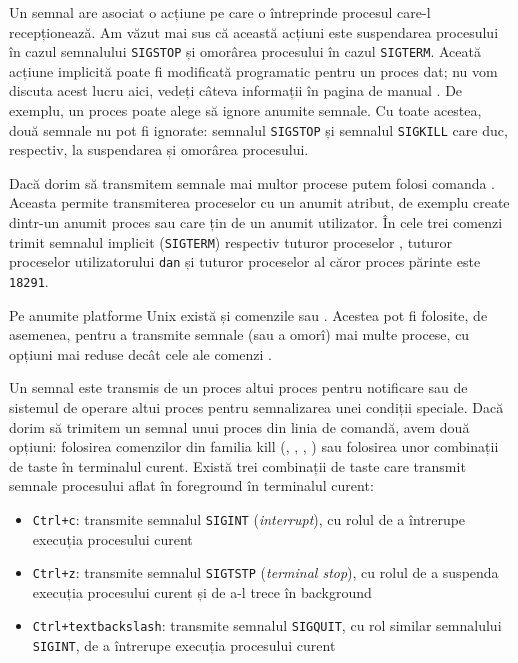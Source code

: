 Un semnal are asociat o acțiune pe care o întreprinde procesul care-l
recepționează. Am văzut mai sus că această acțiuni este suspendarea procesului
în cazul semnalului \texttt{SIGSTOP} și omorârea procesului în cazul \texttt{SIGTERM}. Aceată
acțiune implicită poate fi modificată programatic pentru un proces dat; nu vom
discuta acest lucru aici, vedeți câteva informații în pagina de manual . De exemplu, un proces poate alege să ignore anumite semnale. Cu toate
acestea, două semnale nu pot fi ignorate: semnalul \texttt{SIGSTOP} și semnalul \texttt{SIGKILL}
care duc, respectiv, la suspendarea și omorârea procesului.

Dacă dorim să transmitem semnale mai multor procese putem folosi comanda .
Aceasta permite transmiterea proceselor cu un anumit atribut, de exemplu create
dintr-un anumit proces sau care țin de un anumit utilizator.
În  cele trei comenzi trimit semnalul implicit (\texttt{SIGTERM}) respectiv tuturor proceselor , tuturor proceselor utilizatorului \texttt{dan} și tuturor proceselor al căror proces părinte este \texttt{18291}.


Pe anumite platforme Unix există și comenzile  sau . Acestea pot fi
folosite, de asemenea, pentru a transmite semnale (sau a omorî) mai multe
procese, cu opțiuni mai reduse decât cele ale comenzi .

Un semnal este transmis de un proces altui proces pentru notificare sau de
sistemul de operare altui proces pentru semnalizarea unei condiții speciale.
Dacă dorim să trimitem un semnal unui proces din linia de comandă, avem două
opțiuni: folosirea comenzilor din familia kill (, , , ) sau
folosirea unor combinații de taste în terminalul curent. Există trei combinații
de taste care transmit semnale procesului aflat în foreground în terminalul
curent:

\begin{itemize}
  \item \texttt{Ctrl+c}: transmite semnalul \texttt{SIGINT} (\textit{interrupt}), cu rolul de a
		întrerupe execuția procesului curent
  \item \texttt{Ctrl+z}: transmite semnalul \texttt{SIGTSTP} (\textit{terminal stop}), cu rolul de a suspenda execuția
		procesului curent și de a-l trece în background
  \item \texttt{Ctrl+textbackslash{}}: transmite semnalul \texttt{SIGQUIT}, cu rol similar
                semnalului \texttt{SIGINT}, de a întrerupe execuția procesului curent
\end{itemize}

